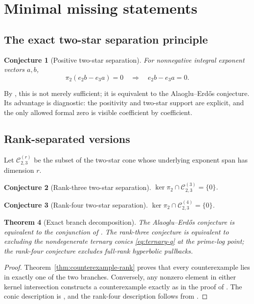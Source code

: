 \documentclass[11pt]{article}
\newtheorem{theorem}{Theorem}[section]
\newtheorem{conjecture}[theorem]{Conjecture}
\theoremstyle{definition}
\theoremstyle{remark}
\begin{document}
\section{Minimal missing statements}
\label{sec:minimal-missing}

\subsection{The exact two-star separation principle}

\begin{conjecture}[Positive two-star separation]
\label{conj:two-star-separation}
For nonnegative integral exponent vectors $a,b$,
\[
 \pi_2(e_2b-e_3a)=0
 \quad\Longrightarrow\quad
 e_2b-e_3a=0.
\]
\end{conjecture}

By , this is not merely sufficient; it is equivalent to the
Alaoglu--Erd\H{o}s conjecture.  Its advantage is diagnostic: the positivity and two-star
support are explicit, and the only allowed formal zero is visible coefficient by
coefficient.

\subsection{Rank-separated versions}

Let $\mathcal C_{2,3}^{(r)}$ be the subset of the two-star cone whose underlying exponent
span has dimension $r$.

\begin{conjecture}[Rank-three two-star separation]
\label{conj:rank3}
$\ker\pi_2\cap\mathcal C_{2,3}^{(3)}=\{0\}$.
\end{conjecture}

\begin{conjecture}[Rank-four two-star separation]
\label{conj:rank4}
$\ker\pi_2\cap\mathcal C_{2,3}^{(4)}=\{0\}$.
\end{conjecture}

\begin{theorem}[Exact branch decomposition]
\label{thm:branch-decomposition}
The Alaoglu--Erd\H{o}s conjecture is equivalent to the conjunction of
.  The rank-three conjecture is equivalent to excluding the
nondegenerate ternary conics \eqref{eq:ternary-q} at the prime-log point; the rank-four
conjecture excludes full-rank hyperbolic pullbacks.
\end{theorem}

\begin{proof}
Theorem~\ref{thm:counterexample-rank} proves that every counterexample lies in exactly one of
the two branches.  Conversely, any nonzero element in either kernel intersection constructs
a counterexample exactly as in the proof of .  The conic
description is , and the rank-four description follows from
.
\end{proof}
\end{document}
